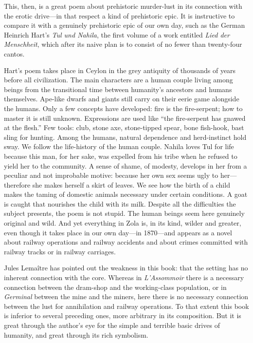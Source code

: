 \documentclass[12pt,a4paper]{article}
\begin{document}
This, then, is a great poem about prehistoric murder-lust in its
connection with the erotic drive---in that respect a kind of
prehistoric epic. It is instructive to compare it with a genuinely
prehistoric epic of our own day, such as the German Heinrich Hart's
\textit{Tul und Nahila}, the first volume of a work entitled \textit{Lied
der Menschheit}, which after its naive plan is to consist of no fewer
than twenty-four cantos.

Hart's poem takes place in Ceylon in the grey antiquity of thousands
of years before all civilization. The main characters are a human
couple living among beings from the transitional time between
humanity's ancestors and humans themselves. Ape-like dwarfs and giants
still carry on their eerie game alongside the humans. Only a few
concepts have developed: fire is the fire-serpent; how to master it
is still unknown. Expressions are used like ``the fire-serpent has
gnawed at the flesh.'' Few tools: club, stone axe, stone-tipped spear,
bone fish-hook, bast sling for hunting. Among the humans, natural
dependence and herd-instinct hold sway. We follow the life-history of
the human couple. Nahila loves Tul for life because this man, for her
sake, was expelled from his tribe when he refused to yield her to the
community. A sense of shame, of modesty, develops in her from a
peculiar and not improbable motive: because her own sex seems ugly to
her---therefore she makes herself a skirt of leaves. We see how the
birth of a child makes the taming of domestic animals necessary under
certain conditions. A goat is caught that nourishes the child with its
milk. Despite all the difficulties the subject presents, the poem is
not stupid. The human beings seem here genuinely original and wild.
And yet everything in Zola is, in its kind, wilder and greater, even
though it takes place in our own day---in 1870---and appears as a
novel about railway operations and railway accidents and about crimes
committed with railway tracks or in railway carriages.

Jules Lemaître has pointed out the weakness in this book: that the
setting has no inherent connection with the core. Whereas in
\textit{L'Assommoir} there is a necessary connection between the
dram-shop and the working-class population, or in \textit{Germinal}
between the mine and the miners, here there is no necessary connection
between the lust for annihilation and railway operations. To that
extent this book is inferior to several preceding ones, more arbitrary
in its composition. But it is great through the author's eye for the
simple and terrible basic drives of humanity, and great through its
rich symbolism.
\end{document}
